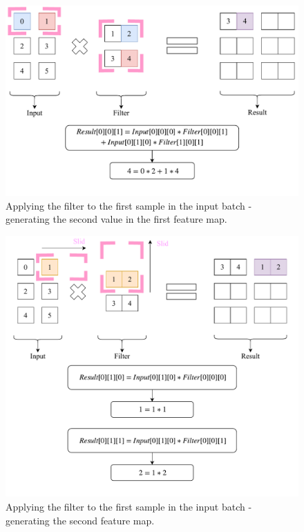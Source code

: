 \documentclass[12pt]{article}
\begin{document}
\begin{figure}[!htbp]
\begin{center}
	\includegraphics[width=\textwidth]{firstConvSample_step2}
	\begin{center}
		\caption{ Applying the filter to the first sample in the input batch - generating the second value in the first feature map.}
	\end{center}
\end{center}
\end{figure}
\begin{figure}[!htbp]
\begin{center}
	\includegraphics[width=\textwidth]{firstConvSample_step3}
	\begin{center}
		\caption{ Applying the filter to the first sample in the input batch - generating the second feature map.}
	\end{center}
\end{center}
\end{figure}
\end{document}
